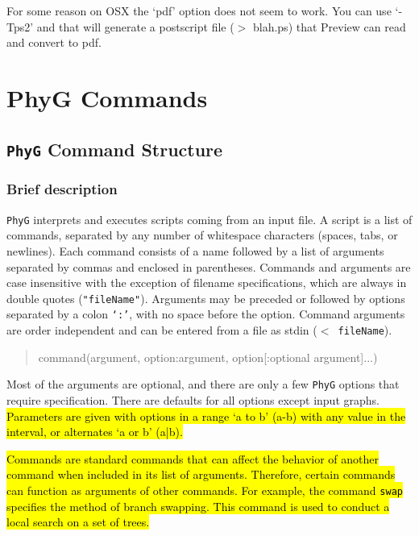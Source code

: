 \documentclass[11pt]{book}
\newcommand{\phyg}{\texttt{PhyG} }
\begin{document}
{{	For some reason on OSX the `pdf' option does not seem to work. You can use `-Tps2' and that will generate 
	a postscript file ($>$ blah.ps) that Preview can read and convert to pdf.

	

	
\chapter{PhyG Commands}

\section{\phyg Command Structure}
		
	\subsection{Brief description}
		\phyg interprets and executes scripts coming from an input file. A script is a list of 
		commands, separated by any number of whitespace characters (spaces, tabs, or 
		newlines). Each command consists of a name followed by a list of arguments 
		separated by commas and enclosed in parentheses. Commands and arguments 
		are case insensitive with the exception of filename specifications, which are always 
		in double quotes (\texttt{"fileName"}). Arguments may be preceded or followed by 
		options separated by a colon \texttt{`:'}, with no space before the option. Command 
		arguments are order independent and can be entered from a file as stdin 
		(\texttt{$<$ fileName}).
		
		\begin{quote}
		command(argument, option:argument, option[:optional argument]...)
		\end{quote}
	
		\noindent Most of the arguments are optional, and there are only a few \phyg options
		 that require specification. 	There are defaults for all options except input graphs. 
		 \hl{Parameters are given with options in a range `a to b' (a-b) with any value in the interval, 
		 or alternates `a or b' (a|b).} 
		
		\hl{Commands are standard commands that can affect the behavior of another command 
		when included in its list of arguments. Therefore, certain commands can function as 
		arguments of other commands. For example, the command \texttt{swap} specifies 
		the method of branch swapping. This command is used to conduct a local search on 
		a set of trees.} %

}}
\end{document}
